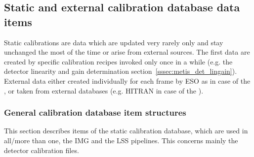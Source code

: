 
\subsection{Static and external calibration database data items}\label{ssec:caldb_items_structures}
Static calibrations are data which are updated very rarely only and stay unchanged the most of the time or arise from external sources. The first data are created by specific calibration recipes invoked only once in a while (e.g. the detector linearity and gain determination section~\ref{sssec:metis_det_lingain}). External data either created individually for each frame by \ac{ESO} as in case of the , or taken from external databases (e.g. \ac{HITRAN} in case of the ).

\subsubsection{General calibration database item structures}\label{sssec:generalcaldbdatastructs}
This section describes items of the static calibration database, which are used in all/more than one, the \ac{IMG} and the \ac{LSS} pipelines. This concerns mainly the detector calibration files.


\label{dataitem:gainmap}
\label{dataitem:gain_map_2rg}
\label{dataitem:gain_map_geo}
\label{dataitem:gain_map_ifu}



\label{dataitem:badpixmap}








\label{dataitem:linearity}
\label{dataitem:linearity_lm}
\label{dataitem:linearity_ifu}
\label{dataitem:linearity_n}
\label{dataitem:linearity_2rg}
\label{dataitem:linearity_geo}


\label{dataitem:masterdark}










